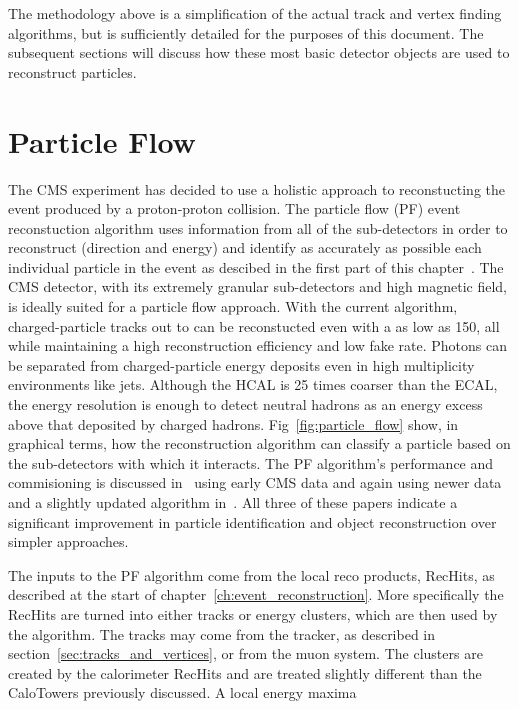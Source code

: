 The methodology above is a simplification of the actual track and vertex finding algorithms, but is sufficiently detailed for the purposes of this document. The subsequent sections will discuss how these most basic detector objects are used to reconstruct particles.

\section{Particle Flow}
\label{sec:particle_flow}

The CMS experiment has decided to use a holistic approach to reconstucting the event produced by a proton-proton collision.
The particle flow (PF) event reconstuction algorithm uses information from all of the sub-detectors in order to reconstruct (direction and energy) and identify as accurately as possible each individual particle in the event as descibed in the first part of this chapter~\cite{CMS-PAS-PFT-09-001}.
The CMS detector, with its extremely granular sub-detectors and high magnetic field, is ideally suited for a particle flow approach.
With the current algorithm, charged-particle tracks out to  can be reconstucted even with a \pt as low as 150\mev, all while maintaining a high reconstruction efficiency and low fake rate.
Photons can be separated from charged-particle energy deposits even in high multiplicity environments like jets.
Although the HCAL is 25 times coarser than the ECAL, the energy resolution is enough to detect neutral hadrons as an energy excess above that deposited by charged hadrons.
Fig~\ref{fig:particle_flow} show, in graphical terms, how the reconstruction algorithm can classify a particle based on the sub-detectors with which it interacts.
The PF algorithm's performance and commisioning is discussed in~\cite{CMS-PAS-PFT-10-002,CMS-PAS-PFT-10-003} using early CMS data and again using newer data and a slightly updated algorithm in~\cite{Beaudette:2014cea}.
All three of these papers indicate a significant improvement in particle identification and object reconstruction over simpler approaches.

The inputs to the PF algorithm come from the local reco products, RecHits, as described at the start of chapter~\ref{ch:event_reconstruction}. More specifically the RecHits are turned into either tracks or energy clusters, which are then used by the algorithm. The tracks may come from the tracker, as described in section~\ref{sec:tracks_and_vertices}, or from the muon system. The clusters are created by the calorimeter RecHits and are treated slightly different than the CaloTowers previously discussed. A local energy maxima









